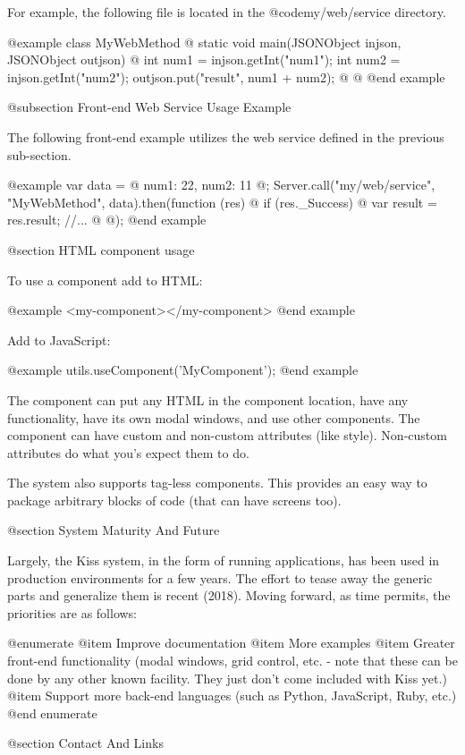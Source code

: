 For example, the following file is located in the
@code{my/web/service} directory.

@example
class MyWebMethod @{
    static void main(JSONObject injson, JSONObject outjson) @{
        int num1 = injson.getInt("num1");
        int num2 = injson.getInt("num2");
        outjson.put("result", num1 + num2);
    @}
@}
@end example

@subsection Front-end Web Service Usage Example

The following front-end example utilizes the web service defined in the
previous sub-section.

@example
var data = @{
    num1:  22,
    num2:  11
@};
Server.call("my/web/service", "MyWebMethod", data).then(function (res) @{
    if (res._Success) @{
        var result = res.result;
        //...
    @}
@});
@end example
    
@section HTML component usage
   
To use a component add to HTML:

@example
<my-component></my-component>
@end example

Add to JavaScript:

@example
utils.useComponent('MyComponent');
@end example
    
The component can put any HTML in the component location, have any
functionality, have its own modal windows, and use other components.
The component can have custom and non-custom attributes (like style).
Non-custom attributes do what you's expect them to do.

The system also supports tag-less components.  This provides an easy
way to package arbitrary blocks of code (that can have screens too).

@section System Maturity And Future

Largely, the Kiss system, in the form of running applications, has
been used in production environments for a few years.  The effort to
tease away the generic parts and generalize them is recent (2018).
Moving forward, as time permits, the priorities are as follows:

@enumerate
@item
Improve documentation
@item
More examples
@item
Greater front-end functionality (modal windows, grid control, etc. - note that these can be done by any other known facility.  They just don't come included with Kiss yet.)
@item
Support more back-end languages (such as Python, JavaScript, Ruby, etc.)
@end enumerate

@section Contact And Links

